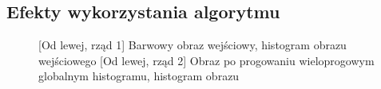 \documentclass[a4paper,12pt, titlepage]{report}
\begin{document}
\subsection*{Efekty wykorzystania algorytmu}
\begin{figure}[h]
    \centering
    \qquad
    \caption{[Od lewej, rząd 1] Barwowy obraz wejściowy, histogram obrazu wejściowego [Od lewej, rząd 2] Obraz po progowaniu wieloprogowym globalnym histogramu, histogram obrazu}%
    \label{fig:geo_after_grey1}%
\end{figure}
\end{document}
